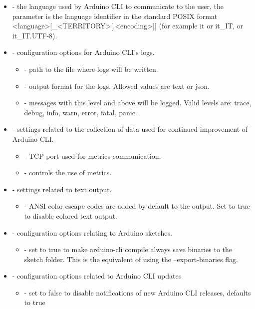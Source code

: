 \begin{itemize}
\begin{itemize}
	\end{itemize}
	\item {} - the language used by Arduino CLI to communicate to the user, the parameter is the language identifier in the standard POSIX format <language>[\_<TERRITORY>[.<encoding>]] (for example it or it\_IT, or it\_IT.UTF-8).
	\item {} - configuration options for Arduino CLI's logs.
	\begin{itemize}
		\item {} - path to the file where logs will be written.
		\item {} - output format for the logs. Allowed values are text or json.
		\item {} - messages with this level and above will be logged. Valid levels are: trace, debug, info, warn, error, fatal, panic.
	\end{itemize}
	\item {} - settings related to the collection of data used for continued improvement of Arduino CLI.
	\begin{itemize}
		\item {} - TCP port used for metrics communication.
		\item {} - controls the use of metrics.
	\end{itemize}
	\item {} - settings related to text output.
	\begin{itemize}
		\item {} - ANSI color escape codes are added by default to the output. Set to true to disable colored text output.
	\end{itemize}
	\item {} - configuration options relating to Arduino sketches.
	\begin{itemize}
		\item {} - set to true to make arduino-cli compile always save binaries to the sketch folder. This is the equivalent of using the --export-binaries flag.
	\end{itemize}
	\item {} - configuration options related to Arduino CLI updates
	\begin{itemize}
		\item {} - set to false to disable notifications of new Arduino CLI releases, defaults to true

\end{itemize}
\end{itemize}

